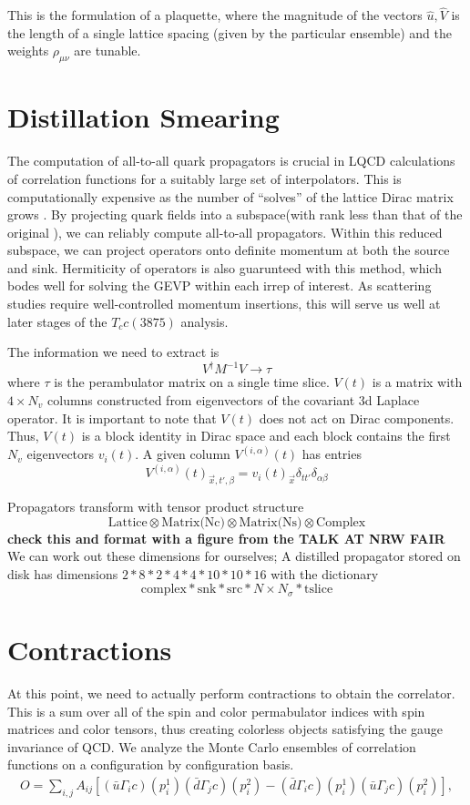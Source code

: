 This is the formulation of a plaquette, where the magnitude of the vectors $\hat{u}, \hat{V}$ is the length of a single lattice spacing (given by the particular ensemble) and the weights $\rho_{\mu\nu}$ are tunable. 

\section{Distillation Smearing}
The computation of all-to-all quark propagators is crucial in LQCD calculations of correlation functions for a suitably large set of interpolators. This is computationally expensive as the number of ``solves'' of the lattice Dirac matrix grows . By projecting quark fields into a subspace(with rank less than that of the original ), we can reliably compute all-to-all propagators\cite{peardon_novel_2009}. Within this reduced subspace, we can project operators onto definite momentum at both the source and sink. Hermiticity of operators is also guarunteed with this method, which bodes well for solving the GEVP within each irrep of interest. As scattering studies require well-controlled momentum insertions, this will serve us well at later stages of the $T_cc(3875)$ analysis.  

The information we need to extract is 
$$ V^{\dagger}M^{-1}V \rightarrow \tau $$ 
where $\tau$ is the perambulator matrix on a single time slice. 
$V(t)$ is a matrix with $4 \times N_v $  columns constructed from eigenvectors of the covariant 3d Laplace operator. It is important to note that $V(t)$ does not act on Dirac components. Thus, $V(t)$ is a block identity in Dirac space and each block contains the first $N_v$ eigenvectors $v_i(t)$. A given column $V^{(i,\alpha)}(t)$ has entries 
$$ V^{(i,\alpha)}(t)_{\vec{x},t',\beta} = v_i(t)_{\vec{x}} \delta_{tt'}\delta_{\alpha\beta}$$


Propagators transform with tensor product structure 
$$\text{Lattice} \otimes \text{Matrix(Nc)} \otimes \text{Matrix(Ns)} \otimes \text{Complex}$$
\textbf{check this and format with a figure from the TALK AT NRW FAIR }
We can work out these dimensions for ourselves; A distilled propagator stored on disk has dimensions 
$ 2 * 8 *2 *4 *4 *10 * 10 * 16$ 
with the dictionary 
$$\text{} \text{complex} * \text{snk} * \text{src} * N \times N_{\sigma} * \text{tslice}$$
\section{Contractions}
At this point, we need to actually perform contractions to obtain the correlator. This is a sum over all of the spin and color permabulator indices with spin matrices and color tensors, thus creating colorless objects satisfying the gauge invariance of QCD. We analyze the Monte Carlo ensembles of correlation functions on a configuration by configuration basis. 
\begin{align}
    \label{ops_cc}
    O=\sum_{i,j} A_{ij}  [(\bar u\Gamma_i c)( p^1_{i})(\bar d\Gamma_{j} c)(p^2_{i}) -  (\bar d \Gamma_i c)({ p^1_{i}})(\bar u\Gamma_{j} c)({ p^2_{i}}) ]\nonumber,
    \end{align}

